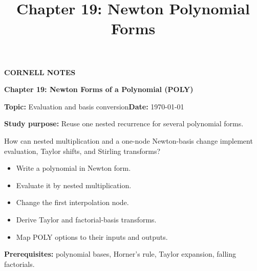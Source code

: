 \documentclass[10pt,letterpaper]{article}
\title{Chapter 19: Newton Polynomial Forms}
\author{}
\date{}
\begin{document}
\maketitle
\begin{tcolorbox}[colback=Paper,colframe=Ink]{\small\bfseries\color{Teal}CORNELL NOTES}\par{\LARGE\bfseries Chapter 19: Newton Forms of a Polynomial (POLY)}\par\medskip\textbf{Topic:} Evaluation and basis conversion\hfill\textbf{Date:} \today\par\textbf{Study purpose:} Reuse one nested recurrence for several polynomial forms.\end{tcolorbox}
\begin{tcolorbox}[colback=Teal!5,colframe=Teal,title=Essential question]How can nested multiplication and a one-node Newton-basis change implement evaluation, Taylor shifts, and Stirling transforms?\end{tcolorbox}
\begin{tcolorbox}[colback=white,colframe=Mist,title=Learning objectives]\begin{itemize}\item Write a polynomial in Newton form.\item Evaluate it by nested multiplication.\item Change the first interpolation node.\item Derive Taylor and factorial-basis transforms.\item Map POLY options to their inputs and outputs.\end{itemize}\textbf{Prerequisites:} polynomial bases, Horner's rule, Taylor expansion, falling factorials.\end{tcolorbox}
\end{document}
